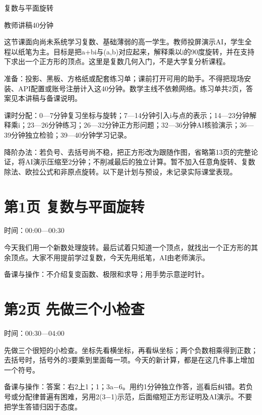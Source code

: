 \documentclass[UTF8,a4paper,11pt,fontset=fandol]{ctexart}
\begin{document}
\begin{center}{\LARGE 复数与平面旋转}\par 教师讲稿\quad 40分钟\end{center}

这节课面向尚未系统学习复数、基础薄弱的高一学生。教师投屏演示AI，学生全程以纸笔为主。目标是把a+bi与(a,b)对应起来，解释乘以i的90度旋转，并在支持下求出一个正方形的顶点。这里是复数几何入门，不是大学复分析课程。

准备：投影、黑板、方格纸或配套练习单；课前打开可用的助手。不得把现场安装、API配置或账号注册计入这40分钟。数学主线不依赖网络。练习单共2页，答案见本讲稿与备课说明。

课时分配：0—7分钟复习坐标与旋转；7—14分钟引入i与点的表示；14—23分钟解释乘i；23—26分钟练习；26—32分钟正方形问题；32—36分钟AI核验演示；36—39分钟独立检验；39—40分钟学习记录。

降阶办法：若负号、去括号尚不稳，把正方形改为跟随作图，省略第13页的完整论证，将AI演示压缩至2分钟；不削减最后的独立计算。暂不加入任意角旋转、复数除法、欧拉公式和非原点旋转。以下是计划与预设，未记录实际课堂表现。


\clearpage

\par\noindent\begin{minipage}{\linewidth}

\section*{第1页 复数与平面旋转}

时间：00:00—00:30

今天我们用一个新数处理旋转。最后试着只知道一个顶点，就找出一个正方形的其余顶点。大家不用提前学过复数，今天先用纸笔，AI由老师演示。

{\small\color{black!65}备课与操作：不介绍复变函数、极限和求导；用手势示意逆时针。}

\end{minipage}\par\vspace{3mm}

\par\noindent\begin{minipage}{\linewidth}

\section*{第2页 先做三个小检查}

时间：00:30—04:00

先做三个很短的小检查。坐标先看横坐标，再看纵坐标；两个负数相乘得到正数；去括号时，括号外的3要乘到里面每一项。今天的新计算，都是在这几件事上增加一个符号。

{\small\color{black!65}备课与操作：答案：右2上1；1；3a−6。用约1分钟独立作答，巡看后纠错。若负号或分配律普遍有困难，另用2(3−1)示范，后面缩短正方形证明及AI演示。不要把学生答错归因于态度。}

\end{minipage}\par\vspace{3mm}
\end{document}
